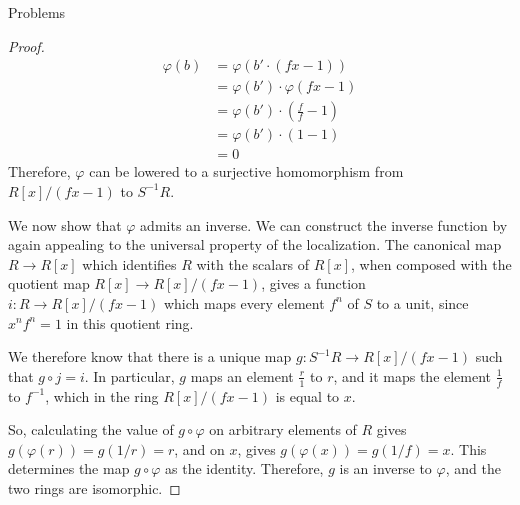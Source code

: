 \documentclass[12pt]{article}
\theoremstyle{definition}
\begin{document}
\begin{section}{Problems}
\begin{proof}
\begin{align*}
	\varphi(b) &= \varphi(b' \cdot (fx - 1))\\
	&= \varphi(b') \cdot \varphi(fx - 1)\\
	&= \varphi(b') \cdot (\frac{f}{f} - 1)\\
	&= \varphi(b') \cdot (1 - 1)\\
	&= 0
\end{align*}
Therefore, $\varphi$ can be lowered to a surjective homomorphism from $R[x]/(fx - 1)$ to $S^{-1}R$. 
\par We now show that $\varphi$ admits an inverse. We can construct the inverse function by again appealing to the universal property of the localization. The canonical map $R \to R[x]$ which identifies $R$ with the scalars of $R[x]$, when composed with the quotient map $R[x] \to R[x]/(fx - 1)$, gives a function $i : R \to R[x]/(fx - 1)$ which maps every element $f^n$ of $S$ to a unit, since $x^nf^n = 1$ in this quotient ring.
\par We therefore know that there is a unique map $g : S^{-1}R \to R[x]/(fx - 1)$ such that $g \circ j = i$. In particular, $g$ maps an element $\frac{r}{1}$ to $r$, and it maps the element $\frac{1}{f}$ to $f^{-1}$, which in the ring $R[x]/(fx - 1)$ is equal to $x$. 
\par So, calculating the value of $g\circ \varphi$ on arbitrary elements of $R$ gives $g(\varphi(r)) = g(1/r) = r$, and on $x$, gives $g(\varphi(x)) = g(1/f) = x$. This determines the map $g \circ \varphi$ as the identity. Therefore, $g$ is an inverse to $\varphi$, and the two rings are isomorphic.
\end{proof}
\end{section}
\end{document}
